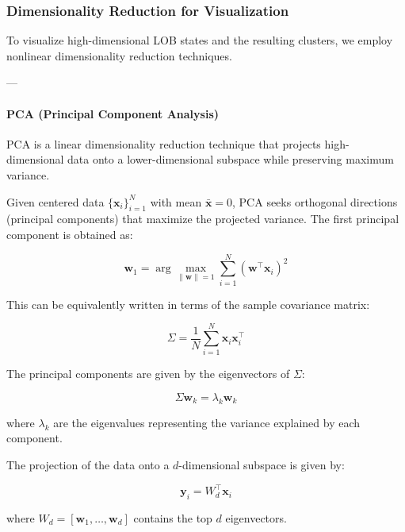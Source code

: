 \documentclass[12pt,a4paper]{report}
\begin{document}
\subsubsection{Dimensionality Reduction for Visualization}

To visualize high-dimensional LOB states and the resulting clusters, we employ nonlinear dimensionality reduction techniques.

---
\paragraph{PCA (Principal Component Analysis)}

PCA is a linear dimensionality reduction technique that projects high-dimensional data onto a lower-dimensional subspace while preserving maximum variance.

Given centered data $\{\mathbf{x}_i\}_{i=1}^N$ with mean $\bar{\mathbf{x}} = 0$, PCA seeks orthogonal directions (principal components) that maximize the projected variance. The first principal component is obtained as:

\begin{equation}
    \mathbf{w}_1 = \arg\max_{\|\mathbf{w}\| = 1} \sum_{i=1}^{N} (\mathbf{w}^\top \mathbf{x}_i)^2
\end{equation}

This can be equivalently written in terms of the sample covariance matrix:

\begin{equation}
    \Sigma = \frac{1}{N} \sum_{i=1}^{N} \mathbf{x}_i \mathbf{x}_i^\top
\end{equation}

The principal components are given by the eigenvectors of $\Sigma$:

\begin{equation}
    \Sigma \mathbf{w}_k = \lambda_k \mathbf{w}_k
\end{equation}

where $\lambda_k$ are the eigenvalues representing the variance explained by each component.

The projection of the data onto a $d$-dimensional subspace is given by:

\begin{equation}
    \mathbf{y}_i = W_d^\top \mathbf{x}_i
\end{equation}

where $W_d = [\mathbf{w}_1, \dots, \mathbf{w}_d]$ contains the top $d$ eigenvectors.
\end{document}
